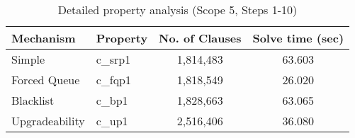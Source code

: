 \begin{table}[htbp]
\centering
\begin{tabular}{|l|l|c|c|}
\hline
\textbf{Mechanism} & \textbf{Property} & \textbf{No. of Clauses} & \textbf{Solve time (sec)} \\
\hline
Simple & c_srp1 & 1,814,483 & 63.603 \\
Forced Queue & c_fqp1 & 1,818,549 & 26.020 \\
Blacklist & c_bp1 & 1,828,663 & 63.065 \\
Upgradeability & c_up1 & 2,516,406 & 36.080 \\
\hline
\end{tabular}
\caption{Detailed property analysis (Scope 5, Steps 1-10)}
\label{tab:detailed_properties_steps_10}
\end{table}
